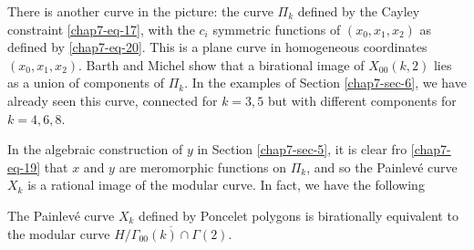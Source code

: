 There is another curve in the picture: the curve $\Pi_{k}$ defined by the Cayley constraint \eqref{chap7-eq-17}, with the $c_{i}$ symmetric functions of $(x_{0}, x_{1},x_{2})$ as defined by \eqref{chap7-eq-20}. This is a plane curve in homogeneous coordinates $(x_{0},x_{1},x_{2})$. Barth and Michel show that a birational image of $X_{00}(k,2)$ lies as a union of components of $\Pi_{k}$. In the examples of Section \ref{chap7-sec-6}, we have already seen this curve, connected for $k=3,5$ but with different components for $k=4,6,8$.

In the algebraic construction of $y$ in Section \ref{chap7-sec-5}, it is clear fro \eqref{chap7-eq-19} that $x$ and $y$ are meromorphic functions on $\Pi_{k}$, and so the Painlev\'e curve $X_{k}$ is a rational image of the modular curve. In fact, we have the following

\begin{proposition}\label{chap7-proposition-7}
The Painlev\'e curve $X_{k}$ defined by Poncelet polygons is birationally equivalent to the modular curve $\overline{H/\Gamma_{00}(k)\cap \Gamma(2)}$.
\end{proposition}

